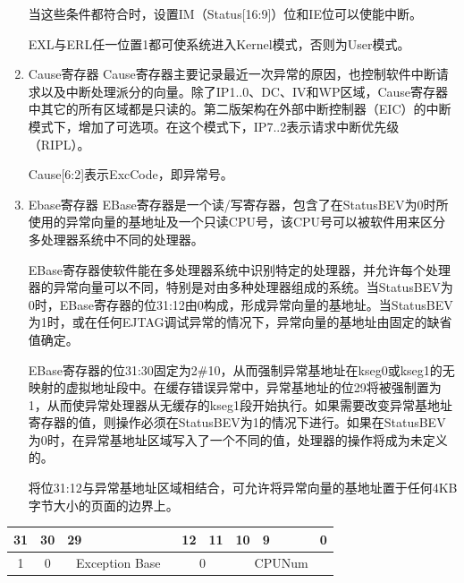 \begin{enumerate}[(1)]
当这些条件都符合时，设置IM（Status[16:9]）位和IE位可以使能中断。

EXL与ERL任一位置1都可使系统进入Kernel模式，否则为User模式。

\item Cause寄存器
Cause寄存器主要记录最近一次异常的原因，也控制软件中断请求以及中断处理派分的向量。除了IP1..0、DC、IV和WP区域，Cause寄存器中其它的所有区域都是只读的。第二版架构在外部中断控制器（EIC）的中断模式下，增加了可选项。在这个模式下，IP7..2表示请求中断优先级（RIPL）。

Cause[6:2]表示ExcCode，即异常号。

\item Ebase寄存器
EBase寄存器是一个读/写寄存器，包含了在StatusBEV为0时所使用的异常向量的基地址及一个只读CPU号，该CPU号可以被软件用来区分多处理器系统中不同的处理器。

EBase寄存器使软件能在多处理器系统中识别特定的处理器，并允许每个处理器的异常向量可以不同，特别是对由多种处理器组成的系统。当StatusBEV为0时，EBase寄存器的位31:12由0构成，形成异常向量的基地址。当StatusBEV为1时，或在任何EJTAG调试异常的情况下，异常向量的基地址由固定的缺省值确定。

EBase寄存器的位31:30固定为2\#10，从而强制异常基地址在kseg0或kseg1的无映射的虚拟地址段中。在缓存错误异常中，异常基地址的位29将被强制置为1，从而使异常处理器从无缓存的kseg1段开始执行。如果需要改变异常基地址寄存器的值，则操作必须在StatusBEV为1的情况下进行。如果在StatusBEV为0时，在异常基地址区域写入了一个不同的值，处理器的操作将成为未定义的。

将位31:12与异常基地址区域相结合，可允许将异常向量的基地址置于任何4KB字节大小的页面的边界上。

\end{enumerate}

\begin{table}
\centering
\begin{tabular}{cccccccccccccccccc}
31&30&29&&&&&&&&12&11&10&9&&&&0\\
\hline
\multicolumn{1}{|c|}{1}&
\multicolumn{1}{c|}{0}&
\multicolumn{8}{c|}{Exception Base}&
\multicolumn{2}{c|}{0}&
\multicolumn{6}{c|}{CPUNum}\\
\hline
\end{tabular}
\end{table}

